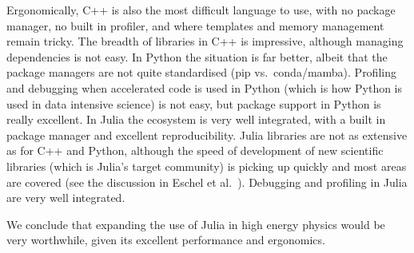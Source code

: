 \documentclass{webofc}
\begin{document}
Ergonomically, C++ is also the most difficult language to use, with no package
manager, no built in profiler, and where templates and memory management remain
tricky. The breadth of libraries in C++ is impressive, although managing
dependencies is not easy. In Python the situation is far better, albeit that the
package managers are not quite standardised (pip vs.\ conda/mamba). Profiling
and debugging when accelerated code is used in Python (which is how Python is
used in data intensive science) is not easy, but package support in Python is
really excellent. In Julia the ecosystem is very well integrated, with a built
in package manager and excellent reproducibility. Julia libraries are not as
extensive as for C++ and Python, although the speed of development of new
scientific libraries (which is Julia's target community) is picking up quickly
and most areas are covered (see the discussion in Eschel et
al.~\cite{eschle2023potential}). Debugging and profiling in Julia are very well
integrated.

We conclude that expanding the use of Julia in high energy
physics would be very worthwhile, given its excellent performance and ergonomics.

\sloppy
\raggedright

\end{document}
